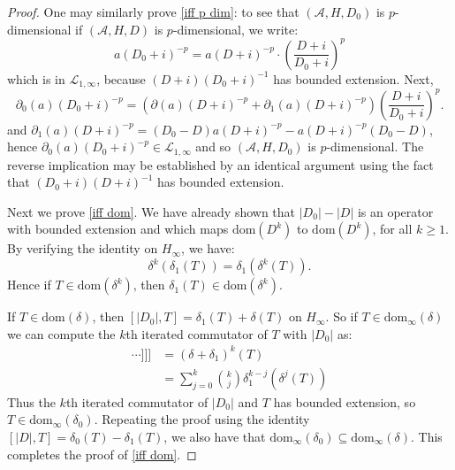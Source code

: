 \begin{proof}
        One may similarly prove \eqref{iff p dim}: to see that $(\mathcal{A},H,D_0)$ is $p$-dimensional if $(\mathcal{A},H,D)$ is $p$-dimensional,
        we write:
        \begin{equation*}
            a(D_0+i)^{-p} = a(D+i)^{-p}\cdot \left(\frac{D+i}{D_0+i}\right)^p
        \end{equation*}
        which is in $\mathcal{L}_{1,\infty}$, because $(D+i)(D_0+i)^{-1}$ has bounded extension. Next,
        \begin{equation*}
            \partial_0(a)(D_0+i)^{-p} = (\partial(a)(D+i)^{-p}+\partial_1(a)(D+i)^{-p})\left(\frac{D+i}{D_0+i}\right)^p.
        \end{equation*}
        and $\partial_1(a)(D+i)^{-p} = (D_0-D)a(D+i)^{-p}-a(D+i)^{-p}(D_0-D)$, hence $\partial_0(a)(D_0+i)^{-p} \in \mathcal{L}_{1,\infty}$ and so $(\mathcal{A},H,D_0)$ is $p$-dimensional. The reverse
        implication may be established by an identical argument { using the fact that $(D_0+i)(D+i)^{-1}$ has bounded extension.}
        
        Next we prove \eqref{iff dom}. We have already shown that $|D_0|-|D|$ is an operator with bounded extension and which maps $\mathrm{dom}(D^k)$ to $\mathrm{dom}(D^k)$, for all $k\geq 1$. 
        By verifying the identity on $H_\infty$, we have:
        \begin{equation*}
            \delta^k(\delta_1(T)) = \delta_1(\delta^k(T)).
        \end{equation*}
        Hence if $T \in \mathrm{dom}(\delta^k)$, then $\delta_1(T) \in \mathrm{dom}(\delta^k)$.
        
        If $T \in \mathrm{dom}(\delta)$, then $[|D_0|,T] = \delta_1(T)+\delta(T)$ on $H_\infty$. So if $T \in \mathrm{dom}_\infty(\delta)$ we can compute the $k$th iterated commutator of $T$ with $|D_0|$ as:
        \begin{align}
            [|D_0|,[|D_0|,[\cdots,[|D_0|,T]\cdots]]] &= (\delta+\delta_1)^k(T)\nonumber\\
                                                     &= \sum_{j=0}^k \binom{k}{j}\delta_1^{k-j}(\delta^{j}(T))\label{binomial formula}
        \end{align}
        Thus the $k$th iterated commutator of $|D_0|$ and $T$ has bounded extension, so $T \in \mathrm{dom}_\infty(\delta_0)$. Repeating the proof using the identity $[|D|,T] = \delta_0(T)-\delta_1(T)$, 
        we also have that $\mathrm{dom}_\infty(\delta_0) \subseteq \mathrm{dom}_\infty(\delta)$. This completes the proof of \eqref{iff dom}.
        

\end{proof}
